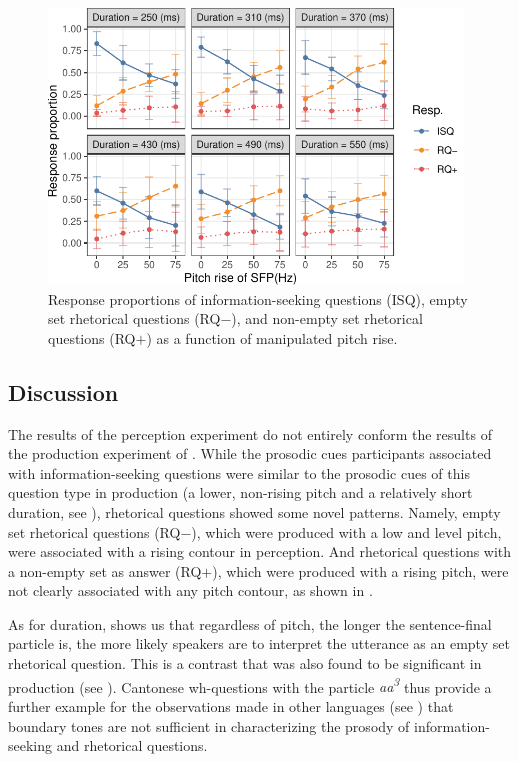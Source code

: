 \documentclass[output=paper,colorlinks,citecolor=brown            ,chinesefont]{langscibook}
\begin{document}
\begin{figure}
    \centering
    \includegraphics[width=11cm]{figures/results_pitch_no_tag.pdf}
    \caption{Response proportions of information-seeking questions (ISQ), empty set rhetorical questions (RQ$-$), and non-empty set rhetorical questions (RQ$+$) as a function of manipulated pitch rise.}
    \label{fig:ret2}
\end{figure}

\subsection{Discussion}

The results of the perception experiment do not entirely conform the results of the production experiment of \citet{Lo+2019}. While the prosodic cues participants associated with information-seeking questions were similar to the prosodic cues of this question type in production (a lower, non-rising pitch and a relatively short duration, see ), rhetorical questions showed some novel patterns. Namely, empty set rhetorical questions (RQ$-$), which were produced with a low and level pitch, were associated with a rising contour in perception. And rhetorical questions with a non-empty set as answer (RQ$+$), which were produced with a rising pitch, were not clearly associated with any pitch contour, as shown in . 

As for duration,  shows us that regardless of pitch, the longer the sentence-final particle is, the more likely speakers are to interpret the utterance as an empty set rhetorical question. This is a contrast that was also found to be significant in production (see ). Cantonese wh-questions with the particle \textit{aa\textsuperscript{3}} thus provide a further example for the observations made in other languages (see ) that boundary tones are not sufficient in characterizing the prosody of information-seeking and rhetorical questions.
\end{document}
